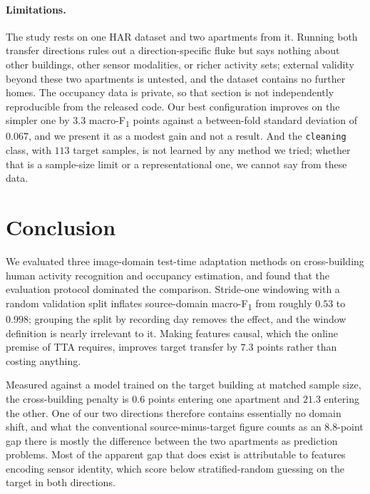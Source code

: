 \documentclass[a4paper,fleqn]{cas-dc}
\newcommand{\macf}{macro-F\textsubscript{1}}
\begin{document}
\paragraph{Limitations.} The study rests on one HAR dataset and two apartments from it.
Running both transfer directions rules out a direction-specific fluke but says nothing
about other buildings, other sensor modalities, or richer activity sets; external validity
beyond these two apartments is untested, and the dataset contains no further homes. The
occupancy data is private, so that section is not independently
reproducible from the released code. Our best configuration improves on the simpler one by
$3.3$ \macf{} points against a between-fold standard deviation of $0.067$, and we present
it as a modest gain and not a result. And the \texttt{cleaning} class, with $113$ target
samples, is not learned by any method we tried; whether that is a sample-size limit or a
representational one, we cannot say from these data.

\section{Conclusion}
\label{sec:conclusion}

We evaluated three image-domain test-time adaptation methods on cross-building human
activity recognition and occupancy estimation, and found that the evaluation protocol
dominated the comparison. Stride-one windowing with a random validation split inflates
source-domain \macf{} from roughly $0.53$ to $0.998$; grouping the split by recording day
removes the effect, and the window definition is nearly irrelevant to it. Making features
causal, which the online premise of TTA requires, improves target transfer by $7.3$ points
rather than costing anything.

Measured against a model trained on the target building at matched sample size, the
cross-building penalty is $0.6$ points entering one apartment and $21.3$ entering the
other. One of our two directions therefore contains essentially no domain shift, and what
the conventional source-minus-target figure counts as an $8.8$-point gap there is mostly
the difference between the two apartments as prediction problems. Most of the apparent gap
that does exist is attributable to features encoding sensor identity, which score below
stratified-random guessing on the target in both directions.
\end{document}
